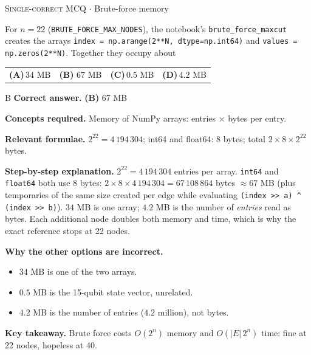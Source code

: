 \documentclass[11pt,a4paper]{article}
\newcommand{\optlabel}[1]{\textbf{(#1)}}
\newcommand{\correctlabel}[1]{\textcolor{okgreen}{\textbf{(#1)}\,\ding{51}}}
\newenvironment{qitem}[1]{\begin{list}{}{\setlength{\leftmargin}{3.3em}\setlength{\labelwidth}{3.1em}%
  \setlength{\labelsep}{0.2em}\setlength{\topsep}{3pt}\setlength{\parsep}{3pt}}\item[\textbf{Q.#1}\hfill]}{\end{list}}
\newcommand{\qsep}{\par\vspace{2pt}{\color{black!15}\hrule}\vspace{4pt}}
\newcommand{\qmeta}[2]{{\footnotesize\color{black!60}\textsc{#1} \;$\cdot$\; #2}\par}
\begin{document}
\begin{qitem}{66}
\qmeta{Single-correct MCQ}{Brute-force memory}
For $n = 22$ (\texttt{BRUTE\_FORCE\_MAX\_NODES}), the notebook's \texttt{brute\_force\_maxcut} creates the arrays
\texttt{index = np.arange(2**N, dtype=np.int64)} and \texttt{values = np.zeros(2**N)}. Together they occupy about
\par\smallskip\noindent\begin{tabularx}{\linewidth}{@{}*{4}{L}@{}}
\optlabel{A}\,$34$ MB & \correctlabel{B}\,$67$ MB & \optlabel{C}\,$0.5$ MB & \optlabel{D}\,$4.2$ MB
\end{tabularx}
\end{qitem}
\begin{solbox}{B}
\textbf{\color{brand}Correct answer.} \textcolor{okgreen}{\textbf{(B)}} $67$ MB

\textbf{\color{brand}Concepts required.} Memory of NumPy arrays: entries $\times$ bytes per entry.

\textbf{\color{brand}Relevant formulae.} $2^{22} = 4\,194\,304$; int64 and float64: $8$ bytes; total $2\times8\times2^{22}$ bytes.

\textbf{\color{brand}Step-by-step explanation.} $2^{22} = 4\,194\,304$ entries per array. \texttt{int64} and \texttt{float64} both use $8$ bytes:
$2 \times 8 \times 4\,194\,304 = 67\,108\,864$ bytes $\approx 67$ MB (plus temporaries of the same size created per edge while
evaluating \texttt{(index >> a) \^{} (index >> b)}). $34$ MB is one array; $4.2$ MB is the number of \emph{entries} read as bytes.
Each additional node doubles both memory and time, which is why the exact reference stops at 22 nodes.

\textbf{\color{brand}Why the other options are incorrect.}
\begin{itemize}[leftmargin=2.4em, itemsep=1pt, topsep=2pt]
\item[\textbf{(A)}] $34$ MB is one of the two arrays.
\item[\textbf{(C)}] $0.5$ MB is the 15-qubit state vector, unrelated.
\item[\textbf{(D)}] $4.2$ MB is the number of entries ($4.2$ million), not bytes.
\end{itemize}
\textbf{\color{brand}Key takeaway.} Brute force costs $O(2^n)$ memory and $O(|E|\,2^n)$ time: fine at 22 nodes, hopeless at 40.
\end{solbox}
\qsep
\end{document}
